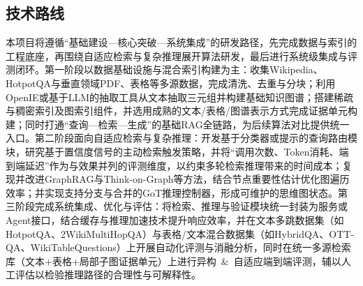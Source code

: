 \subsection{技术路线}
本项目将遵循“基础建设—核心突破—系统集成”的研发路径，先完成数据与索引的工程底座，再围绕自适应检索与复杂推理展开算法研发，最后进行系统级集成与评测闭环。第一阶段以数据基础设施与混合索引构建为主：收集Wikipedia、HotpotQA\cite{ref22}与垂直领域PDF、表格等多源数据，完成清洗、去重与分块；利用OpenIE\cite{openie}或基于LLM的抽取工具从文本抽取三元组并构建基础知识图谱；搭建稀疏与稠密索引及图索引组件，并选用成熟的文本/表格/图谱表示方式完成证据单元构建；同时打通“查询—检索—生成”的基础RAG全链路，为后续算法对比提供统一入口。第二阶段面向自适应检索与复杂推理：开发基于分类器或提示的查询路由模块，研究基于置信度信号的主动检索触发策略，并将“调用次数、Token消耗、端到端延迟”作为与效果并列的评测维度，以约束多轮检索推理带来的时间成本；复现并改进GraphRAG与Think-on-Graph等方法，结合节点重要性估计优化图遍历效率；并实现支持分支与合并的GoT推理控制器，形成可维护的思维图状态。第三阶段完成系统集成、优化与评估：将检索、推理与验证模块统一封装为服务或Agent接口，结合缓存与推理加速技术提升响应效率，并在文本多跳数据集（如HotpotQA\cite{ref22}、2WikiMultiHopQA\cite{twiki}）与表格/文本混合数据集（如HybridQA\cite{hybridqa}、OTT-QA\cite{ottqa}、WikiTableQuestions\cite{wikitq}）上开展自动化评测与消融分析，同时在统一多源检索库（文本+表格+局部子图证据单元）上进行\mbox{异构 \& 自适应}端到端评测，辅以人工评估以检验推理路径的合理性与可解释性。

